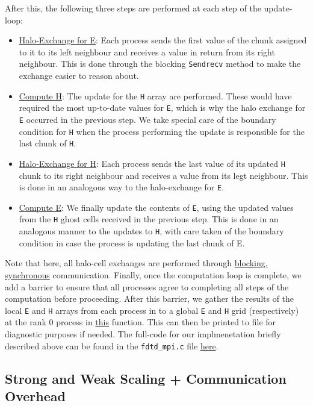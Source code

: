 \documentclass[a4paper,10pt]{article}
\begin{document}
After this, the following three steps are performed at each step of the update-loop:
\begin{itemize}
\item \underline{Halo-Exchange for E}: Each process sends the first value of the chunk assigned to it to its left neighbour and receives a value in return from its right neighbour. This is done through the blocking \verb|Sendrecv| method to make the exchange easier to reason about. 
\item \underline{Compute H}: The update for the \verb|H| array are performed. These would have required the most up-to-date values for \verb|E|, which is why the halo exchange for \verb|E| occurred in the previous step. We take special care of the boundary condition for \verb|H| when the process performing the update is responsible for the last chunk of \verb|H|.
\item \underline{Halo-Exchange for H}: Each process sends the last value of its updated \verb|H| chunk to its right neighbour and receives a value from its legt neighbour. This is done in an analogous way to the halo-exchange for \verb|E|. 
\item \underline{Compute E}: We finally update the contents of \verb|E|, using the updated values from the \verb|H| ghost cells received in the previous step. This is done in an analogous manner to the updates to \verb|H|, with care taken of the boundary condition in case the process is updating the last chunk of E. 
\end{itemize}

Note that here, all halo-cell exchanges are performed through \underline{blocking, synchronous} communication. Finally, once the computation loop is complete, we add a barrier to ensure that all processes agree to completing all steps of the computation before proceeding. After this barrier, we gather the results of the local \verb|E| and \verb|H| arrays from each process in to a global \verb|E| and \verb|H| grid (respectively) at the rank 0 process in \href{https://github.com/paulmyr/DD2356-MethodsHPC/blob/master/5_project/3_mpi/fdtd_mpi.c#L108}{this} function. This can then be printed to file for diagnostic purposes if needed. The full-code for our implmenetation briefly described above can be found in the \verb|fdtd_mpi.c| file \href{https://github.com/paulmyr/DD2356-MethodsHPC/blob/master/5_project/3_mpi/fdtd_mpi.c}{here}.

\subsection{Strong and Weak Scaling + Communication Overhead}
\label{sec:3_mpi_analysis}
\end{document}
